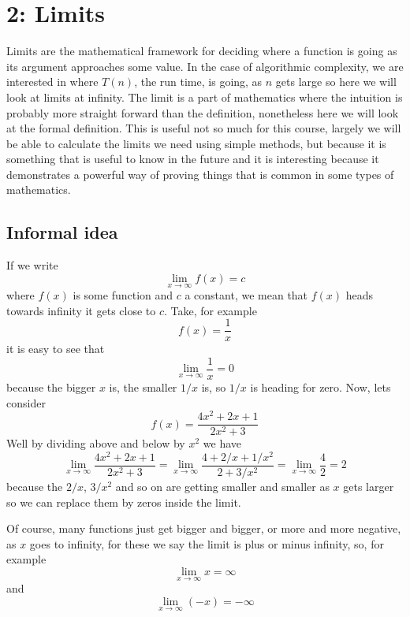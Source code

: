 \documentclass[11pt,a4paper]{scrartcl}
\begin{document}
\section*{2: Limits}

Limits are the mathematical framework for deciding where a function is
going as its argument approaches some value. In the case of algorithmic
complexity, we are interested in where $T(n)$, the run time, is going,
as $n$ gets large so here we will look at limits at infinity. The
limit is a part of mathematics where the intuition is probably more
straight forward than the definition, nonetheless here we will look at
the formal definition. This is useful not so much for this course,
largely we will be able to calculate the limits we need using simple
methods, but because it is something that is useful to know in the
future and it is interesting because it demonstrates a powerful way of
proving things that is common in some types of mathematics.

\subsection*{Informal idea}

If we write
\begin{equation}
\lim_{x\rightarrow \infty}f(x)=c
\end{equation}
where $f(x)$ is some function and $c$ a constant, we mean that $f(x)$
heads towards infinity it gets close to $c$. Take, for example
\begin{equation}
f(x) = \frac{1}{x}
\end{equation}
it is easy to see that 
\begin{equation}
\lim_{x\rightarrow \infty}\frac{1}{x}=0
\end{equation}
because the bigger $x$ is, the smaller $1/x$ is, so $1/x$ is heading for zero. Now, lets consider 
\begin{equation}
f(x)=\frac{4x^2+2x+1}{2x^2+3}
\end{equation}
Well by dividing above and below by $x^2$ we have
\begin{equation}
\lim_{x\rightarrow \infty}\frac{4x^2+2x+1}{2x^2+3}=
\lim_{x\rightarrow \infty}\frac{4+2/x+1/x^2}{2+3/x^2}=
\lim_{x\rightarrow \infty}\frac{4}{2}=2
\end{equation}
because the $2/x$, $3/x^2$ and so on are getting smaller and smaller
as $x$ gets larger so we can replace them by zeros inside the limit.

Of course, many functions just get bigger and bigger, or more and more
negative, as $x$ goes to infinity, for these we say the limit is plus
or minus infinity, so, for example
\begin{equation}
\lim_{x\rightarrow \infty} x=\infty
\end{equation}
and
\begin{equation}
\lim_{x\rightarrow \infty} (-x)=-\infty
\end{equation}
\end{document}
